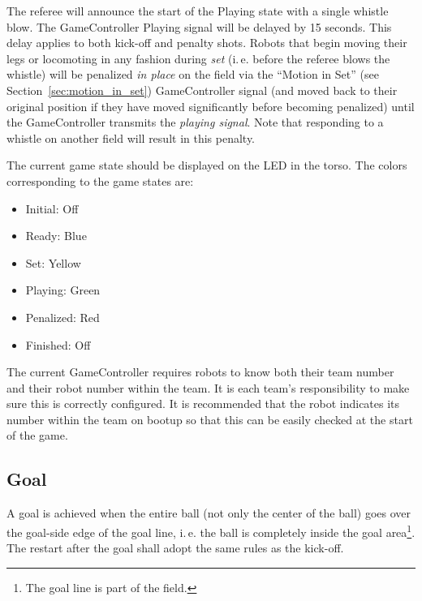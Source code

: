 \documentclass[12pt]{article}
\newcommand{\ie}{\mbox{i.\,e.}\xspace}
\newcommand{\cf}{see\xspace}
\newcommand{\PlayingDelayTime}{15 seconds\xspace}
\begin{document}
The referee will announce the start of the Playing state with a single whistle blow.
The GameController Playing signal will be delayed by \PlayingDelayTime.  
This delay applies to both kick-off and penalty shots.
Robots that begin moving their legs or locomoting in any fashion during \emph{set} (\ie before the referee blows the whistle) will be penalized \textit{in place} on the field via the ``Motion in Set'' (\cf Section~\ref{sec:motion_in_set}) GameController signal (and moved back to their original position if they have moved significantly before becoming penalized) until the GameController transmits the \emph{playing signal}.  
Note that responding to a whistle on another field will result in this penalty.

The current game state should be displayed on the LED in the torso. The colors corresponding to the game states are:

\begin{itemize}

\item Initial: Off

\item Ready: Blue

\item Set: Yellow

\item Playing: Green

\item Penalized: Red

\item Finished: Off

\end{itemize}

The current GameController requires robots to know both their team number and their robot number within the team. It is each team's responsibility to make sure this is correctly configured. It is recommended that the robot indicates its number within the team on bootup so that this can be easily checked at the start of the game.

\subsection{Goal}
\label{sec:goal}
A goal is achieved when the entire ball (not only the center of the ball) goes over the goal-side edge of the goal line, \ie the ball is completely inside the goal area\footnote{The goal line is part of the field.}. The restart after the goal shall adopt the same rules as the kick-off.
\end{document}
